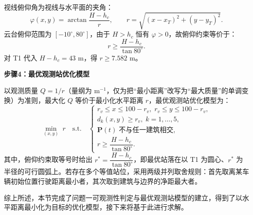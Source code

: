 视线俯仰角为视线与水平面的夹角：
\begin{equation}
    \varphi(x,y)=\arctan\!\frac{H-h_c}{r}, \qquad r=\sqrt{(x-x_T)^2+(y-y_T)^2}.
\end{equation}
云台俯仰范围为 $[-10^\circ,80^\circ]$，由于 $H>h_c$ 恒有 $\varphi>0$，故俯仰约束等价于：
\begin{equation}
    r \ge \frac{H-h_c}{\tan 80^\circ}.
\end{equation}
对 T1 代入 $H-h_c=43$ m，得 $r\ge 7.582$ m。

\textbf{步骤4：最优观测站优化模型}

以观测质量 $Q=1/r$（量纲为 m$^{-1}$，仅为把“最小距离”改写为“最大质量”的单调变换）为准则，最大化 $Q$ 等价于最小化水平距离 $r$，最优观测站优化模型为：
\begin{equation}
    \min_{(x,y)} \; r \quad \text{s.t.} \quad
    \begin{cases}
    r_v\le x\le 100-r_v,\; r_v\le y\le 100-r_v,\\
    d_k(x,y)\ge r_v,\; k=1,\dots,5,\\
    \bm{P}(t)\;\text{不与任一建筑相交},\\
    r \ge \dfrac{H-h_c}{\tan 80^\circ}.
    \end{cases}
\end{equation}
其中，俯仰约束取等号时给出 $r^*=\dfrac{H-h_c}{\tan 80^\circ}$，即最优站落在以 T1 为圆心、$r^*$ 为半径的可行圆弧上。若存在多个等值站位，采用两级并列取舍规则：首先取离某车辆初始位置行驶距离最小者，其次取到建筑与边界的净距最大者。

综上所述，本节完成了问题一可观测性判定与最优观测站模型的建立，得到了以水平距离最小化为目标的优化模型，接下来将基于此进行求解。
